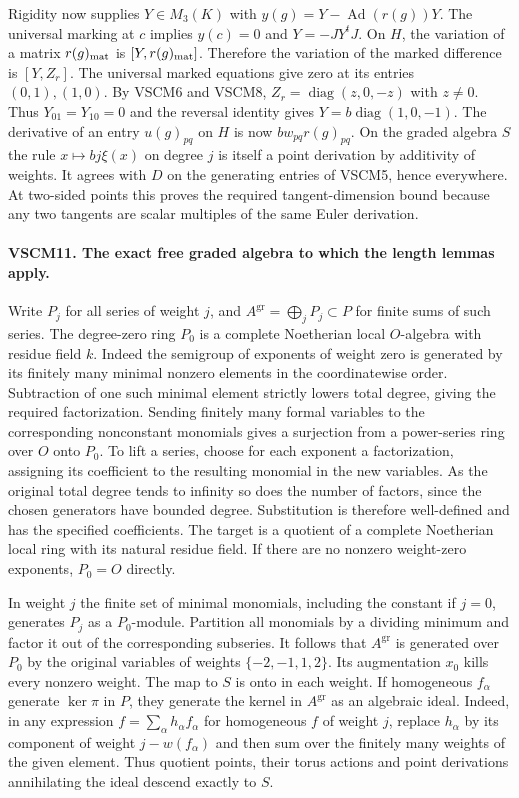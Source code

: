 Rigidity now supplies $Y\in M_3(K)$ with
$y(g)=Y-\operatorname{Ad}(r(g))Y$. The universal marking at $c$
implies $y(c)=0$ and $Y=-JY^tJ$. On $H$, the variation of a
matrix $r(g)_{\rm mat}$ is $[Y,r(g)_{\rm mat}]$. Therefore the
variation of the marked difference is $[Y,Z_r]$. The universal
marked equations give zero at its entries $(0,1),(1,0)$.
By VSCM6 and VSCM8, $Z_r=\operatorname{diag}(z,0,-z)$ with $z\ne0$.
Thus $Y_{01}=Y_{10}=0$ and the reversal identity gives
$Y=b\operatorname{diag}(1,0,-1)$. The derivative of an entry
$u(g)_{pq}$ on $H$ is now $b w_{pq}r(g)_{pq}$. On the graded
algebra $S$ the rule $x\mapsto bj\xi(x)$ on degree $j$ is itself
a point derivation by additivity of weights. It agrees with $D$ on
the generating entries of VSCM5, hence everywhere. At two-sided
points this proves the required tangent-dimension bound because any two
tangents are scalar multiples of the same Euler derivation.

\paragraph{VSCM11. The exact free graded algebra to which the length lemmas apply.}
\label{claim:VSCM11}
Write $P_j$ for all series of weight $j$, and
$A^{\mathrm{gr}}=\bigoplus_jP_j\subset P$ for finite sums of such
series. The degree-zero ring $P_0$ is a complete Noetherian local
$O$-algebra with residue field $k$. Indeed the semigroup of exponents
of weight zero is generated by its finitely many minimal nonzero
elements in the coordinatewise order. Subtraction of one such
minimal element strictly lowers total degree, giving the required
factorization. Sending finitely many formal variables to the
corresponding nonconstant monomials gives a surjection from a
power-series ring over $O$ onto $P_0$. To lift a series, choose for
each exponent a factorization, assigning its coefficient to the
resulting monomial in the new variables. As the original total
degree tends to infinity so does the number of factors, since the
chosen generators have bounded degree. Substitution is therefore
well-defined and has the specified coefficients. The target is a
quotient of a complete Noetherian local ring with its natural
residue field. If there are no nonzero weight-zero exponents,
$P_0=O$ directly.

In weight $j$ the finite set of minimal monomials, including the
constant if $j=0$, generates $P_j$ as a $P_0$-module. Partition
all monomials by a dividing minimum and factor it out of the
corresponding subseries. It follows that $A^{\mathrm{gr}}$ is
generated over $P_0$ by the original variables of weights
$\{-2,-1,1,2\}$. Its augmentation $x_0$ kills every nonzero weight.
The map to $S$ is onto in each weight. If homogeneous $f_\alpha$
generate $\ker\pi$ in $P$, they generate the kernel in
$A^{\mathrm{gr}}$ as an algebraic ideal. Indeed, in any expression
$f=\sum_\alpha h_\alpha f_\alpha$ for homogeneous $f$ of weight
$j$, replace $h_\alpha$ by its component of weight $j-w(f_\alpha)$
and then sum over the finitely many weights of the given element.
Thus quotient points, their torus actions and point derivations
annihilating the ideal descend exactly to $S$.

